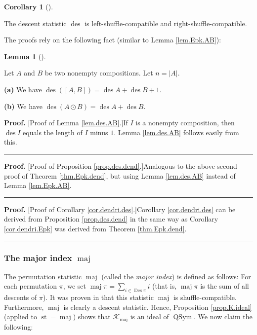 \documentclass[numbers=enddot,12pt,final,onecolumn,notitlepage]{scrartcl}%
\theoremstyle{definition}
\newtheorem{lem}[theo]{Lemma}
\newenvironment{lemma}[1][]
{\begin{lem}[#1]\begin{leftbar}}
{\end{leftbar}\end{lem}}
\newtheorem{coro}[theo]{Corollary}
\newenvironment{corollary}[1][]
{\begin{coro}[#1]\begin{leftbar}}
{\end{leftbar}\end{coro}}
\newenvironment{proof}[1][Proof]{\noindent\textbf{#1.} }{\ \rule{0.5em}{0.5em}}
\newenvironment{verlong}{}{}
\let\sumnonlimits\sum
\renewcommand{\sum}{\sumnonlimits\limits}
\begin{document}
\begin{verlong}
\begin{corollary}
\label{cor.dendri.des}The descent statistic $\operatorname{des}$ is
left-shuffle-compatible and right-shuffle-compatible.
\end{corollary}

The proofs rely on the following fact (similar to Lemma \ref{lem.Epk.AB}):

\begin{lemma}
\label{lem.des.AB}Let $A$ and $B$ be two nonempty compositions. Let
$n=\left\vert A\right\vert $.

\textbf{(a)} We have $\operatorname{des}\left(  \left[  A,B\right]  \right)
=\operatorname{des}A+\operatorname{des}B+1$.

\textbf{(b)} We have $\operatorname{des}\left(  A\odot B\right)
=\operatorname{des}A+\operatorname{des}B$.
\end{lemma}

\begin{proof}
[Proof of Lemma \ref{lem.des.AB}.]If $I$ is a nonempty composition, then
$\operatorname{des}I$ equals the length of $I$ minus $1$. Lemma
\ref{lem.des.AB} follows easily from this.
\end{proof}

\begin{proof}
[Proof of Proposition \ref{prop.des.dend}.]Analogous to the above second proof
of Theorem \ref{thm.Epk.dend}, but using Lemma \ref{lem.des.AB} instead of
Lemma \ref{lem.Epk.AB}.
\end{proof}

\begin{proof}
[Proof of Corollary \ref{cor.dendri.des}.]Corollary \ref{cor.dendri.des} can
be derived from Proposition \ref{prop.des.dend} in the same way as Corollary
\ref{cor.dendri.Epk} was derived from Theorem \ref{thm.Epk.dend}.
\end{proof}

\subsubsection{The major index $\operatorname*{maj}$}

The permutation statistic $\operatorname*{maj}$ (called the \textit{major
index}) is defined as follows: For each permutation $\pi$, we set
$\operatorname*{maj}\pi=\sum_{i\in\operatorname{Des}\pi}i$ (that is,
$\operatorname*{maj}\pi$ is the sum of all descents of $\pi$). It was proven
in \cite[Theorem 3.1 \textbf{(a)}]{part1} that this statistic
$\operatorname*{maj}$ is shuffle-compatible. Furthermore, $\operatorname*{maj}%
$ is clearly a descent statistic. Hence, Proposition \ref{prop.K.ideal}
(applied to $\operatorname{st}=\operatorname*{maj}$) shows that
$\mathcal{K}_{\operatorname*{maj}}$ is an ideal of $\operatorname*{QSym}$. We
now claim the following:


\end{verlong}
\end{document}
